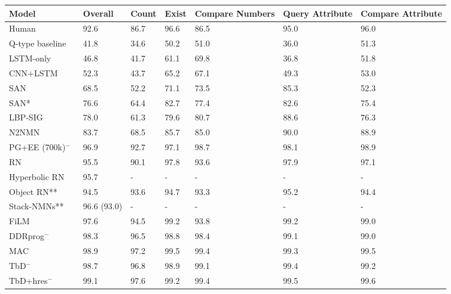\begin{table}
\centering
\begin{threeparttable}
\begin{tabular}{l | C{14mm} | C{10mm} C{10mm} C{14mm} C{14mm} C{14mm}}
\toprule
Model & \textbf{Overall} & Count & Exist & Compare Numbers & Query Attribute & Compare Attribute \\
\hline
Human~\cite{johnson2017clevr}  & 92.6 & 86.7 & 96.6 & 86.5 & 95.0 & 96.0 \\
\hline
Q-type baseline~\cite{johnson2017clevr,antol2015vqa}  & 41.8 & 34.6 & 50.2 & 51.0 & 36.0 & 51.3  \\
LSTM-only~\cite{johnson2017clevr,ren2015image,antol2015vqa,gao2015you,malinowski2015ask} & 46.8 & 41.7 & 61.1 & 69.8 & 36.8 & 51.8  \\
CNN$+$LSTM~\cite{johnson2017clevr,ren2015image,antol2015vqa,gao2015you,malinowski2015ask}  & 52.3 & 43.7 & 65.2 & 67.1 & 49.3 & 53.0  \\
SAN~\cite{johnson2017clevr,yang2015stacked}       & 68.5 & 52.2 & 71.1 & 73.5 & 85.3 & 52.3  \\
SAN*~\cite{santoro2017simple,yang2015stacked}     & 76.6 & 64.4 & 82.7 & 77.4 & 82.6 & 75.4  \\
LBP-SIG~\cite{chen2017sva}  & 78.0 & 61.3 & 79.6 & 80.7 & 88.6 & 76.3  \\
N2NMN~\cite{hu2017learning}  & 83.7 & 68.5 & 85.7 & 85.0 & 90.0 & 88.9 \\
PG+EE (700k)$^-$~\cite{johnson2017inferring} & 96.9 & 92.7 & 97.1 & 98.7 & 98.1 & 98.9 \\
RN~\cite{santoro2017simple} & 95.5 & 90.1 & 97.8 & 93.6 & 97.9 & 97.1 \\
Hyperbolic RN~\cite{gulcehre2018hyperbolic} & 95.7 & - & - & - & - & - \\
Object RN**~\cite{desta2018object} & 94.5 & 93.6 & 94.7 & 93.3 & 95.2 & 94.4 \\
Stack-NMNs**~\cite{explainable2018eccv} & 96.6 (93.0) & - & - & - & - & - \\
FiLM~\cite{perez2017film} & 97.6 & 94.5 & 99.2 & 93.8 & 99.2 & 99.0 \\
DDRprog$^-$~\cite{suarez2018ddrprog} & 98.3 & 96.5 & 98.8 & 98.4 & 99.1 & 99.0 \\
MAC~\cite{hudson2018compositional} & 98.9 & 97.2 & 99.5 & 99.4 & 99.3 & 99.5 \\
TbD$^{-}$~\cite{mascharka2018transparency} & 98.7 & 96.8 & 98.9 & 99.1 & 99.4 & 99.2 \\
TbD+hres$^{-}$~\cite{mascharka2018transparency} & 99.1 & 97.6 & 99.2 & 99.4 & 99.5 & 99.6 \\

\end{tabular}
\end{threeparttable}
\end{table}
